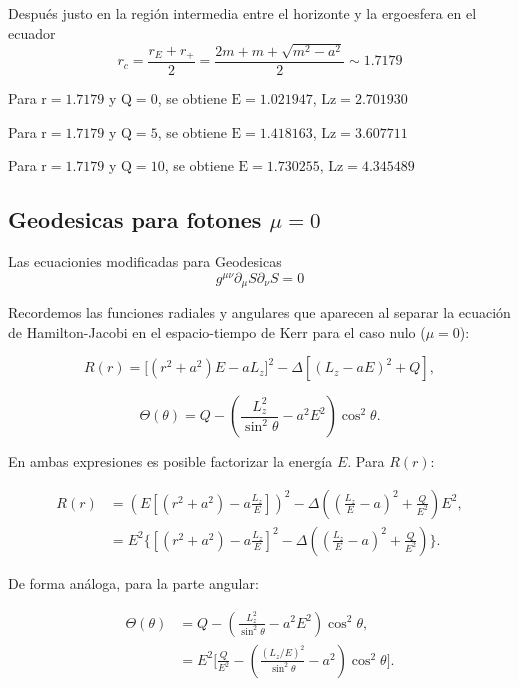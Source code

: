 Después justo en la región intermedia entre el horizonte y la ergoesfera en el ecuador
\begin{equation}
    r_c =\frac{r_E + r_+}{2}=\frac{2m + m +\sqrt{m^2-a^2}}{2}\sim 1.7179
\end{equation}

Para $\mathrm{r}=1.7179$ y $\mathrm{Q}=0$, se obtiene $\mathrm{E}=1.021947$, $\mathrm{Lz}=2.701930$

Para $\mathrm{r}=1.7179$ y $\mathrm{Q}=5$, se obtiene $\mathrm{E}=1.418163$, $\mathrm{Lz}=3.607711$

Para $\mathrm{r}=1.7179$ y $\mathrm{Q}=10$, se obtiene $\mathrm{E}=1.730255$, $\mathrm{Lz}=4.345489$

\subsection{Geodesicas para fotones $\mu =0 $}
Las ecuacionies modificadas para Geodesicas
\begin{equation}
    g^{\mu \nu} \partial_\mu S \partial_\nu S= 0
\end{equation}


Recordemos las funciones radiales y angulares que aparecen al separar la ecuación de Hamilton-Jacobi 
en el espacio-tiempo de Kerr para el caso nulo (\(\mu=0\)):

\begin{equation}
R(r) = \big[(r^2+a^2)E - aL_z\big]^2 - \Delta \left[ (L_z - aE)^2 + Q \right],
\end{equation}

\begin{equation}
\Theta(\theta) = Q - \left( \frac{L_z^2}{\sin^2\theta} - a^2E^2 \right)\cos^2\theta.
\end{equation}

En ambas expresiones es posible factorizar la energía \(E\). Para \(R(r)\):

\begin{align}
R(r) &= \left( E\left[ (r^2+a^2) - a\frac{L_z}{E} \right]\right)^2
- \Delta\left( \left(\frac{L_z}{E}-a\right)^2 + \frac{Q}{E^2} \right) E^2, \\
&= E^2 \Bigg\{ \left[ (r^2+a^2) - a\frac{L_z}{E} \right]^2 
- \Delta\left( \left(\frac{L_z}{E}-a\right)^2 + \frac{Q}{E^2} \right) \Bigg\}.
\end{align}

De forma análoga, para la parte angular:

\begin{align}
\Theta(\theta) &= Q - \left( \frac{L_z^2}{\sin^2\theta} - a^2E^2 \right)\cos^2\theta, \\
&= E^2 \Bigg[ \frac{Q}{E^2} 
- \left( \frac{(L_z/E)^2}{\sin^2\theta} - a^2 \right)\cos^2\theta \Bigg].
\end{align}

